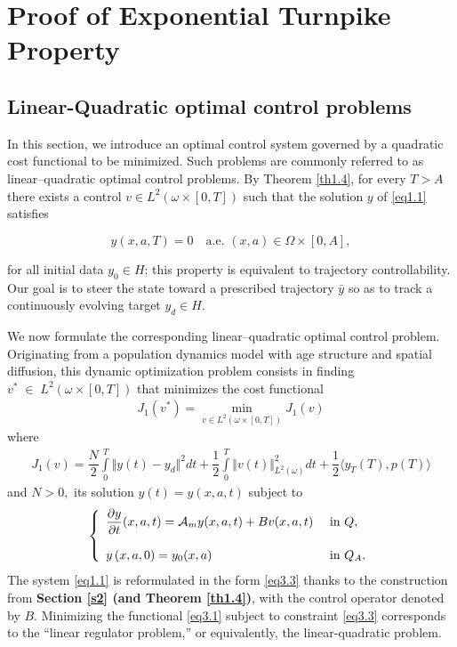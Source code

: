 \documentclass[10pt, a4]{amsart}
\theoremstyle{plain}
\theoremstyle{definition}
\theoremstyle{remark}
\numberwithin{equation}{section}
\begin{document}
\section{Proof of Exponential Turnpike Property}\label{s5}%
\subsection{Linear-Quadratic optimal control problems}

In this section, we introduce an optimal control system governed by a quadratic cost functional to be minimized. Such problems are commonly referred to as linear–quadratic optimal control problems. By Theorem \ref{th1.4}, for every $T>A$ there exists a control $v\in L^2(\omega\times[0,T])$ such that the solution $y$ of \eqref{eq1.1} satisfies

$$
y(x,a,T)=0 \quad \text{a.e. }(x,a)\in \Omega\times[0,A],
$$

for all initial data $y_0\in H$; this property is equivalent to trajectory controllability. Our goal is to steer the state toward a prescribed trajectory $\bar y$ so as to track a continuously evolving target $y_d\in H$.

We now formulate the corresponding linear–quadratic optimal control problem. Originating from a population dynamics model with age structure and spatial diffusion, this dynamic optimization problem consists in finding $v^*\;\in\;L^2(\omega\times[0,T])
$
that minimizes the cost functional
 \begin{align}\label{eq3.1}
     J_1(v^*)=\min_{v\in L^2(\omega\times[0,T])}J_1(v)
 \end{align}
	where
 \begin{align}\label{eq3.2}
     J_1(v)=\dfrac{N}{2}\int\limits_{0}^{T}\Vert y(t)-y_d\Vert^2 dt+\dfrac{1}{2}\int\limits_{0}^{T}\Vert v(t)\Vert^2_{L^2(\omega)}dt+\dfrac{1}{2}\langle y_T(T),p(T)\rangle
 \end{align}
   and $N>0,$  
    its solution $y(t)=y(x,a,t)$ subject to 
\begin{equation}\label{eq3.3}	
\left\lbrace\begin{array}{ll}
\dfrac{\partial y}{\partial t}(x,a,t)=\mathcal{A}_m y(x,a,t)+ Bv(x,a,t)&\hbox{ in }Q,\\  
\\y\left(x,a,0\right)=y_{0}(x,a)&\hbox{ in }  Q_A.
\end{array}\right.
\end{equation}
 The system \eqref{eq1.1} is reformulated in the form \eqref{eq3.3} thanks to the construction from {\bf Section \ref{s2} (and Theorem \ref{th1.4})}, with the control operator denoted by $B$. Minimizing the functional \eqref{eq3.1} subject to constraint \eqref{eq3.3} corresponds to the “linear regulator problem,” or equivalently, the linear-quadratic problem.
\end{document}
